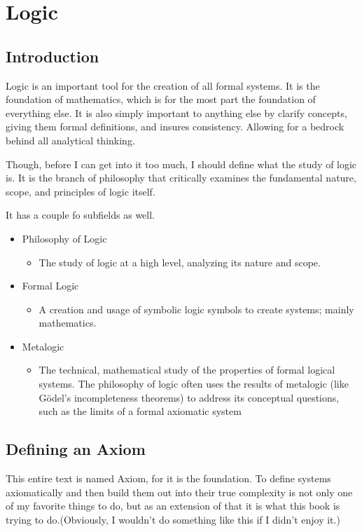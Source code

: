 \chapter{Logic}
\singlespacing
\section{Introduction}
Logic is an important tool for the creation of all formal systems. It is the foundation of mathematics, which is for the most part the foundation of everything else. It is also simply important to anything else by clarify concepts, giving them formal definitions, and insures consistency. Allowing for a bedrock behind all analytical thinking. 

Though, before I can get into it too much, I should define what the study of logic is. It is the branch of philosophy that critically examines the fundamental nature, scope, and principles of logic itself.

It has a couple fo subfields as well. 
\begin{itemize}
    \item Philosophy of Logic
    \begin{itemize}
        \item The study of logic at a high level, analyzing its nature and scope.
    \end{itemize}
    \item Formal Logic
    \begin{itemize}
        \item A creation and usage of symbolic logic symbols to create systems; mainly mathematics.
    \end{itemize}
    \item Metalogic
    \begin{itemize}
        \item The technical, mathematical study of the properties of formal logical systems. The philosophy of logic often uses the results of metalogic (like Gödel's incompleteness theorems) to address its conceptual questions, such as the limits of a formal axiomatic system
    \end{itemize}
\end{itemize}
\section{Defining an Axiom}
This entire text is named Axiom, for it is the foundation. To define systems axiomatically and then build them out into their true complexity is not only one of my favorite things to do, but as an extension of that it is what this book is trying to do.(Obviously, I wouldn't do something like this if I didn't enjoy it.)

